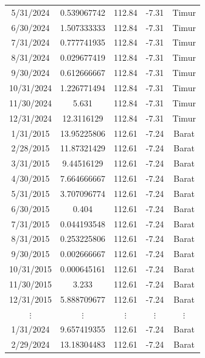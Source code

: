 \begin{longtable}{|c|c|c|c|c|}
    5/31/2024  & 0.539067742  & 112.84 & -7.31 & Timur \\
    6/30/2024  & 1.507333333  & 112.84 & -7.31 & Timur \\
    7/31/2024  & 0.777741935  & 112.84 & -7.31 & Timur \\
    8/31/2024  & 0.029677419  & 112.84 & -7.31 & Timur \\
    9/30/2024  & 0.612666667  & 112.84 & -7.31 & Timur \\
    10/31/2024 & 1.226771494  & 112.84 & -7.31 & Timur \\
    11/30/2024 & 5.631        & 112.84 & -7.31 & Timur \\
    12/31/2024 & 12.3116129   & 112.84 & -7.31 & Timur \\
    \hline

    1/31/2015  & 13.95225806  & 112.61 & -7.24 & Barat \\
    2/28/2015  & 11.87321429   & 112.61 & -7.24 & Barat \\
    3/31/2015  & 9.44516129    & 112.61 & -7.24 & Barat \\
    4/30/2015  & 7.664666667   & 112.61 & -7.24 & Barat \\
    5/31/2015  & 3.707096774   & 112.61 & -7.24 & Barat \\
    6/30/2015  & 0.404         & 112.61 & -7.24 & Barat \\
    7/31/2015  & 0.044193548   & 112.61 & -7.24 & Barat \\
    8/31/2015  & 0.253225806   & 112.61 & -7.24 & Barat \\
    9/30/2015  & 0.002666667   & 112.61 & -7.24 & Barat \\
    10/31/2015 & 0.000645161   & 112.61 & -7.24 & Barat \\
    11/30/2015 & 3.233         & 112.61 & -7.24 & Barat \\
    12/31/2015 & 5.888709677   & 112.61 & -7.24 & Barat \\
    \multicolumn{1}{|c|}{$\vdots$} &
    \multicolumn{1}{c|}{$\vdots$} &
    \multicolumn{1}{c|}{$\vdots$} &
    \multicolumn{1}{c|}{$\vdots$} &
    \multicolumn{1}{c|}{$\vdots$} \\
    1/31/2024  & 9.657419355   & 112.61 & -7.24 & Barat \\
    2/29/2024  & 13.18304483   & 112.61 & -7.24 & Barat \\

\end{longtable}
